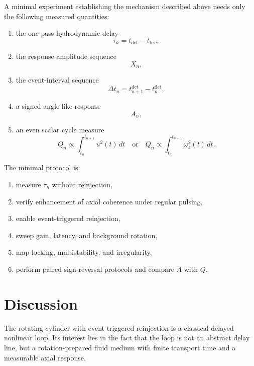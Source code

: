 \documentclass[11pt,a4paper]{article}
\begin{document}
A minimal experiment establishing the mechanism described above needs only the following measured quantities:
\begin{enumerate}
\item the one-pass hydrodynamic delay
\begin{equation}
\tau_h = t_{\mathrm{det}}-t_{\mathrm{fire}},
\end{equation}
\item the response amplitude sequence
\begin{equation}
X_n,
\end{equation}
\item the event-interval sequence
\begin{equation}
\Delta t_n = t_{n+1}^{\mathrm{det}}-t_n^{\mathrm{det}},
\end{equation}
\item a signed angle-like response
\begin{equation}
A_n,
\end{equation}
\item an even scalar cycle measure
\begin{equation}
Q_n \propto \int_{t_n}^{t_{n+1}} u^2(t)\,dt
\quad \text{or} \quad
Q_n \propto \int_{t_n}^{t_{n+1}} \omega_z^2(t)\,dt.
\end{equation}
\end{enumerate}

The minimal protocol is:
\begin{enumerate}
\item measure $\tau_h$ without reinjection,
\item verify enhancement of axial coherence under regular pulsing,
\item enable event-triggered reinjection,
\item sweep gain, latency, and background rotation,
\item map locking, multistability, and irregularity,
\item perform paired sign-reversal protocols and compare $A$ with $Q$.
\end{enumerate}

\section{Discussion}

The rotating cylinder with event-triggered reinjection is a classical delayed nonlinear loop. Its interest lies in the fact that the loop is not an abstract delay line, but a rotation-prepared fluid medium with finite transport time and a measurable axial response.
\end{document}
